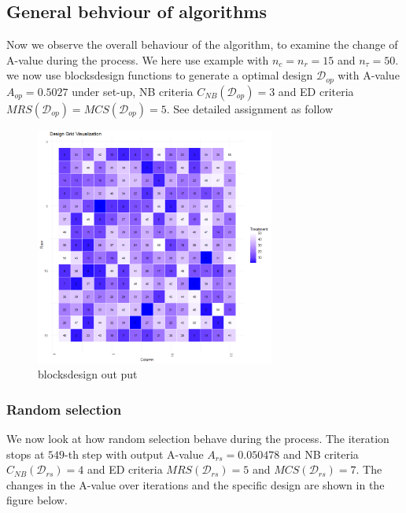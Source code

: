 \documentclass[
  a4paper,
  oneside,
  openany,
  12pt,
  onecolumn]{book}
\theoremstyle{definition}
\theoremstyle{plain}
\theoremstyle{remark}
\begin{document}
\subsection{General behviour of
algorithms}\label{general-behviour-of-algorithms}

Now we observe the overall behaviour of the algorithm, to examine the
change of A-value during the process. We here use example with
\(n_c=n_r=15\) and \(n_\tau=50\). we now use blocksdesign functions to
generate a optimal design \(\mathcal{D}_{op}\) with A-value
\(A_{op} = 0.5027\) under set-up, NB criteria
\(C_{NB}(\mathcal{D}_{op})=3\) and ED criteria
\(MRS(\mathcal{D}_{op})=MCS(\mathcal{D}_{op})=5\). See detailed
assignment as follow

\begin{figure}[H]

{\centering \includegraphics[width=0.7\textwidth,height=\textheight]{images/Rplots/block-design-visualization.png}

}

\caption{blocksdesign out put}

\end{figure}%

\subsubsection{Random selection}\label{random-selection}

We now look at how random selection behave during the process. The
iteration stops at \(549\)-th step with output A-value
\(A_{rs}=0.050478\) and NB criteria \(C_{NB}(\mathcal{D}_{rs})=4\) and
ED criteria \(MRS(\mathcal{D}_{rs})=5\) and \(MCS(\mathcal{D}_{rs})=7\).
The changes in the A-value over iterations and the specific design are
shown in the figure below.
\end{document}
